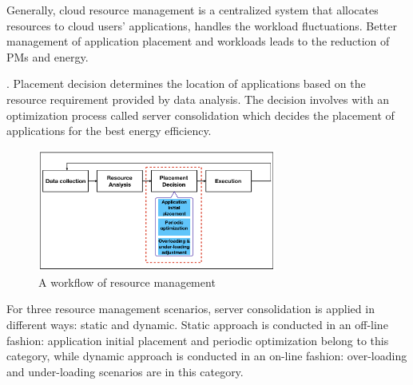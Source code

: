  Generally, cloud resource management is a centralized system \cite{Jennings:2015ht} that allocates resources to cloud users' applications, handles the workload fluctuations. Better management of application placement and workloads leads to the reduction of PMs and energy. 

. Placement decision determines the location of applications based on the resource requirement provided by data analysis. The decision involves with an optimization process called server consolidation which decides the placement of applications for the best energy efficiency. 
\begin{figure}
	\centering
	\includegraphics[width=0.7\textwidth]{pics/workflow_management.png}
	\caption{A workflow of resource management \cite{Mishra:2012kx}}
	\label{fig:workflow}
\end{figure}



 For three resource management scenarios, server consolidation is applied in different ways: static and dynamic. Static approach is conducted in an off-line fashion: application initial placement and periodic optimization belong to this category, while dynamic approach is conducted in an on-line fashion: over-loading and under-loading scenarios are in this category.


